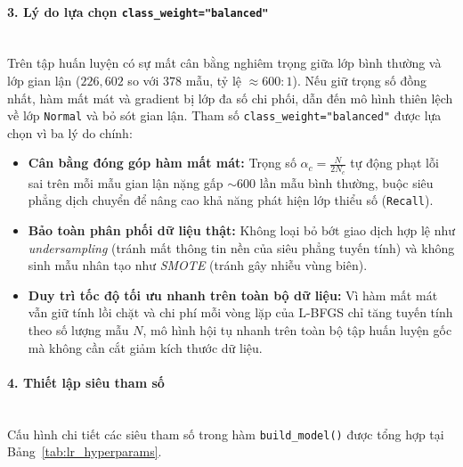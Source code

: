\paragraph{3. Lý do lựa chọn \texttt{class\_weight="balanced"}}\mbox{}\\
Trên tập huấn luyện có sự mất cân bằng nghiêm trọng giữa lớp bình thường và lớp gian lận ($226{,}602$ so với $378$ mẫu, tỷ lệ $\approx 600:1$). Nếu giữ trọng số đồng nhất, hàm mất mát và gradient bị lớp đa số chi phối, dẫn đến mô hình thiên lệch về lớp \texttt{Normal} và bỏ sót gian lận. Tham số \texttt{class\_weight="balanced"} được lựa chọn vì ba lý do chính:
\begin{itemize}
    \item \textbf{Cân bằng đóng góp hàm mất mát:} Trọng số $\alpha_c = \frac{N}{2 N_c}$ tự động phạt lỗi sai trên mỗi mẫu gian lận nặng gấp $\sim 600$ lần mẫu bình thường, buộc siêu phẳng dịch chuyển để nâng cao khả năng phát hiện lớp thiểu số (\texttt{Recall}).
    \item \textbf{Bảo toàn phân phối dữ liệu thật:} Không loại bỏ bớt giao dịch hợp lệ như \textit{undersampling} (tránh mất thông tin nền của siêu phẳng tuyến tính) và không sinh mẫu nhân tạo như \textit{SMOTE} (tránh gây nhiễu vùng biên).
    \item \textbf{Duy trì tốc độ tối ưu nhanh trên toàn bộ dữ liệu:} Vì hàm mất mát vẫn giữ tính lồi chặt và chi phí mỗi vòng lặp của L-BFGS chỉ tăng tuyến tính theo số lượng mẫu $N$, mô hình hội tụ nhanh trên toàn bộ tập huấn luyện gốc mà không cần cắt giảm kích thước dữ liệu.
\end{itemize}

\paragraph{4. Thiết lập siêu tham số}\mbox{}\\
Cấu hình chi tiết các siêu tham số trong hàm \texttt{build\_model()} được tổng hợp tại Bảng~\ref{tab:lr_hyperparams}.

